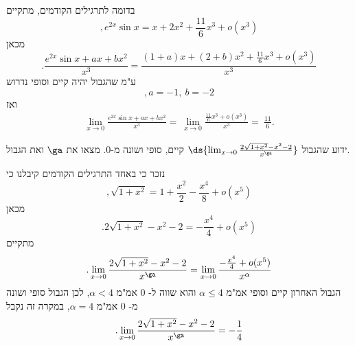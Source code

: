 \begin{solbox}
בדומה לתרגילים הקודמים,
מתקיים
\[
,e^{2x}\sin x=x+2x^2+\frac{11}{6}x^3+o(x^3)
\]
מכאן
$$.\frac{e^{2x}\sin x+ax+bx^2}{x^3}=\frac{(1+a)x+(2+b)x^2+\frac{11}{6}x^3+o(x^3)}{x^3}$$
ע"מ שהגבול יהיה קיים וסופי נדרוש
$$,a=-1,\ b=-2$$
ואז
\begin{align*}
    \lim_{x\to 0}\frac{e^{2x}\sin x+ax+bx^2}{x^3}=\ \lim_{x\to 0}\frac{\frac{11}{6}x^3+o(x^3)}{x^3}
    =\ \frac{11}{6}.
\end{align*}
\end{solbox}
 \item ידוע שהגבול $\ds{\lim_{x\to 0}\frac{2\sqrt{1+x^2}-x^2-2}{x^\ga}}$ קיים, סופי ושונה מ-$0$. מצאו את $\ga$ ואת הגבול.
\begin{solbox}
נזכר כי באחד התרגילים הקודמים קיבלנו כי
$$,\sqrt{1+x^2}=1+\frac{x^2}{2}-\frac{x^4}{8}+o(x^5)$$
מכאן
$$.2\sqrt{1+x^2}-x^2-2=-\frac{x^4}{4}+o(x^5)$$
מתקיים
$$.\lim_{x\to 0}\frac{2\sqrt{1+x^2}-x^2-2}{x^\ga}=\lim_{x\to 0}\frac{-\frac{x^4}{4}+o(x^5)}{x^\alpha}$$
הגבול האחרון קיים וסופי אמ"מ
$\alpha\leq 4$
והוא שווה ל-
$0$
אמ"מ
$\alpha<4$,
לכן
הגבול סופי ושונה מ-
$0$
אמ"מ
$\alpha=4$,
במקרה זה נקבל
$$.\lim_{x\to 0}\frac{2\sqrt{1+x^2}-x^2-2}{x^\ga}=-\frac{1}{4}$$
\end{solbox}
\eE

